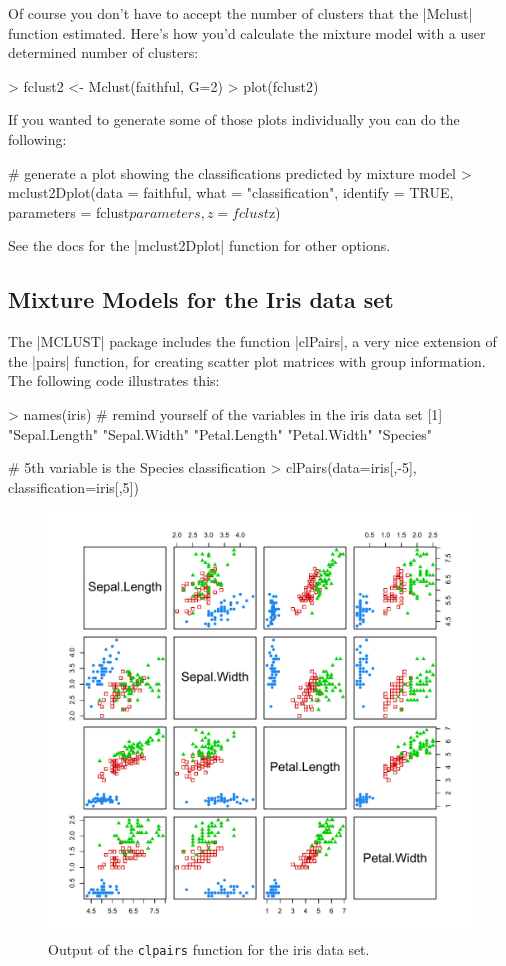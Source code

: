 Of course you don't have to accept the number of clusters that the |Mclust| function estimated. Here's how you'd calculate the mixture model with a user determined number of clusters:

\begin{R}
> fclust2 <- Mclust(faithful, G=2)
> plot(fclust2)
\end{R}



If you wanted to generate some of those plots individually you can do the following:

\begin{R}
# generate a plot showing the classifications predicted by mixture model
> mclust2Dplot(data = faithful, what = "classification", identify = TRUE,
    parameters = fclust$parameters, z = fclust$z)
\end{R}

See the docs for the |mclust2Dplot| function for other options.

\subsection{Mixture Models for the Iris data set}

The |MCLUST| package includes the function |clPairs|, a very nice extension of the |pairs| function, for creating scatter plot matrices with group information. The following code illustrates this:

\begin{R}
> names(iris) # remind yourself of the variables in the iris data set
[1] "Sepal.Length" "Sepal.Width"  "Petal.Length" "Petal.Width"  "Species"

# 5th variable is the Species classification
> clPairs(data=iris[,-5], classification=iris[,5])
\end{R}

\begin{figure}[!ht]
    \centering
    \includegraphics[width=0.5\columnwidth]{./iris-clpairs.pdf}
    \caption{Output of the \texttt{clpairs} function for the iris data set.}\label{fig:clpairs}
\end{figure}


